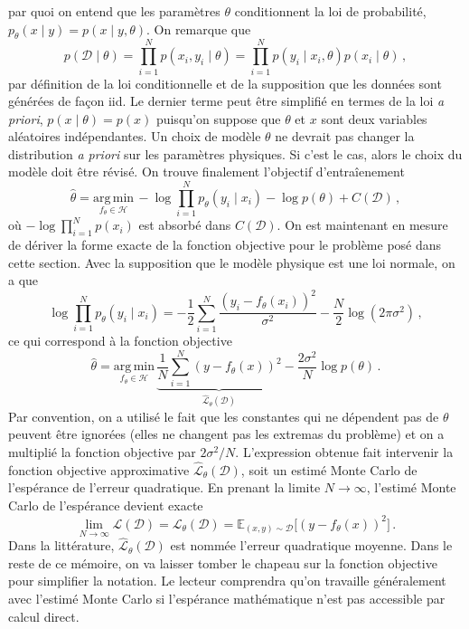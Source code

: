 par quoi on entend que les paramètres $\theta$ conditionnent la loi de probabilité, $p_\theta(x \mid y) = p(x \mid y, \theta)$. On remarque que
\begin{equation}
        p(\mathcal{D} \mid \theta) = \prod_{i=1}^{N}p(x_i, y_i \mid \theta) = \prod_{i=1}^{N}p(y_i \mid x_i, \theta) p(x_i \mid \theta)\, ,
\end{equation} 
par définition de la loi conditionnelle et de la supposition que les données sont générées de façon iid. 
Le dernier terme peut être simplifié en termes de la loi \textit{a priori}, $p(x \mid \theta) = p(x)$ 
puisqu'on suppose que $\theta$ et $x$ sont deux variables aléatoires indépendantes. Un choix de modèle $\theta$ ne devrait pas changer 
la distribution \textit{a priori} sur les paramètres physiques. Si c'est le cas, alors le choix du modèle doit être révisé.
On trouve finalement l'objectif d'entraîenement
\begin{equation}
        \hat{\theta} = \underset{f_\theta \in \mathcal{H}}{\mathrm{arg\, min}}\, -\log \prod_{i=1}^{N}p_\theta(y_i \mid x_i) - \log p(\theta) + C(\mathcal{D})\, ,
\end{equation} 
où $-\log \prod_{i=1}^N p(x_i)$ est absorbé dans $C(\mathcal{D})$. On est maintenant en mesure de dériver la forme exacte de la fonction objective pour le problème 
posé dans cette section. Avec la supposition que le modèle physique est une loi normale, on a que
\begin{equation}
       \log \prod_{i=1}^{N}p_\theta(y_i \mid x_i) = -\frac{1}{2}\sum_{i=1}^{N}\frac{(y_i - f_\theta(x_i))^2}{\sigma^2} - \frac{N}{2}\log(2\pi \sigma^2)\, ,
\end{equation} 
ce qui correspond à la fonction objective
\begin{equation}\label{eq:MSE intro}
        \hat{\theta} = \underset{f_\theta \in \mathcal{H}}{\mathrm{arg\, min}}\, \underbrace{ \frac{1}{N}\sum_{i=1}^{N}
        (y - f_\theta(x))^2 }_{\hat{\mathcal{L}}_\theta(\mathcal{D})}  - \frac{2\sigma^2}{N}\log p(\theta)\, .
\end{equation} 
Par convention, on a utilisé le fait que les constantes qui ne dépendent pas de $\theta$ peuvent être ignorées (elles ne changent pas les extremas du problème) 
et on a multiplié la fonction objective par $2\sigma^2 / N$. 
L'expression obtenue fait intervenir la fonction objective approximative $\hat{\mathcal{L}}_{\theta}(\mathcal{D})$, soit un estimé Monte Carlo de l'espérance de l'erreur 
quadratique. En prenant la limite $N \rightarrow \infty$, l'estimé Monte Carlo de l'espérance devient exacte
\begin{equation}
        \lim\limits_{N \rightarrow \infty}\hat{\mathcal{L}}(\mathcal{D}) = \mathcal{L}_{\theta}(\mathcal{D}) = \mathbb{E}_{(x, y) \sim \mathcal{D}} \big[(y - f_\theta(x))^2\big]\, .
\end{equation} 
Dans la littérature, $\hat{\mathcal{L}}_\theta(\mathcal{D})$ est nommée l'erreur quadratique moyenne. Dans le reste de ce mémoire, on va laisser 
tomber le chapeau sur la fonction objective pour simplifier la notation. Le lecteur comprendra qu'on travaille généralement avec l'estimé 
Monte Carlo si l'espérance mathématique n'est pas accessible par calcul direct.

